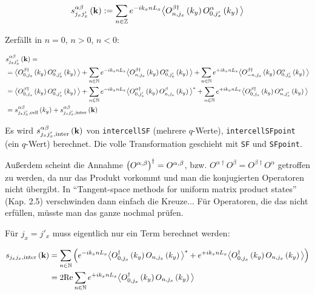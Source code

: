 \documentclass[12pt,paper=a4,BCOR=16mm]{article}
\begin{document}
\begin{equation}
s^{\alpha\beta}_{j_xj'_x}\left(\mathbf{k}\right) := \sum_{n\in\mathbb{Z}} e^{-ik_xnL_x} \big< O^{\beta\dagger}_{n,j_x}\left(k_y\right) O^{\alpha}_{0,j'_x}\left(k_y\right) \big>
\end{equation}

Zerf\"allt in $n=0$, $n>0$, $n<0$:

\begin{equation}
\begin{split}
&s^{\alpha\beta}_{j_xj'_x}\left(\mathbf{k}\right) =\\
                           &= \big< O^{\beta\dagger}_{0,j_x}\left(k_y\right) O^{\alpha}_{0,j'_x}\left(k_y\right) \big> + 
                               \sum_{n\in\mathbb{N}} e^{-ik_xnL_x} \big< O^{\beta\dagger}_{n,j_x}\left(k_y\right) O^{\alpha}_{0,j'_x}\left(k_y\right) \big> +
                               \sum_{n\in\mathbb{N}} e^{+ik_xnL_x} \big< O^{\beta\dagger}_{-n,j_x}\left(k_y\right) O^{\alpha}_{0,j'_x}\left(k_y\right) \big> \\
                            &= \big< O^{\beta\dagger}_{0,j_x}\left(k_y\right) O^{\alpha}_{0,j'_x}\left(k_y\right) \big> + 
                               \sum_{n\in\mathbb{N}} e^{-ik_xnL_x} \big< O^{\alpha\dagger}_{0,j'_x}\left(k_y\right) O^{\beta}_{n,j_x}\left(k_y\right) \big>^* + 
                               \sum_{n\in\mathbb{N}} e^{+ik_xnL_x} \big< O^{\beta\dagger}_{0,j_x}\left(k_y\right) O^{\alpha}_{n,j'_x}\left(k_y\right) \big>\\
                            &= s^{\alpha\beta}_{j_xj'_x,\text{cell}}\left(k_y\right) + s^{\alpha\beta}_{j_xj'_x,\text{inter}}\left(\mathbf{k}\right)
\end{split}
\end{equation}

Es wird $s^{\alpha\beta}_{j_xj'_x,\text{inter}}\left(\mathbf{k}\right)$ von \texttt{intercellSF} (mehrere $q$-Werte), \texttt{intercellSFpoint} (ein $q$-Wert) berechnet. Die volle Transformation geschieht mit \texttt{SF} und \texttt{SFpoint}.

Au{\ss}erdem scheint die Annahme $\left(O^{\alpha,\beta}\right)^{\dagger}=O^{\alpha,\beta}$, bzw. $O^{\alpha\dagger}O^{\beta} = O^{\beta\dagger}O^{\alpha}$ getroffen zu werden, da nur das Produkt vorkommt und man die konjugierten Operatoren nicht \"ubergibt. In ``Tangent-space methods for uniform matrix product states'' (Kap. 2.5) verschwinden dann einfach die Kreuze... F\"ur Operatoren, die das nicht erf\"ullen, m\"usste man das ganze nochmal pr\"ufen.

F\"ur $j_x=j'_x$ muss eigentlich nur ein Term berechnet werden:

\begin{equation}
\begin{split}
s_{j_xj_x,\text{inter}}\left(\mathbf{k}\right) &= \sum_{n\in\mathbb{N}} \left(e^{-ik_xnL_x}\big< O^{\dagger}_{0,j_x}\left(k_y\right) O_{n,j_x}\left(k_y\right) \big>^* + e^{+ik_xnL_x}\big< O^{\dagger}_{0,j_x}\left(k_y\right) O_{n,j_x}\left(k_y\right) \big>\right)\\
                                                &= 2\text{Re} \sum_{n\in\mathbb{N}} e^{+ik_xnL_x} \big< O_{0,j_x}^{\dagger}\left(k_y\right) O_{n,j_x}\left(k_y\right) \big>
\end{split}
\end{equation}
\end{document}
